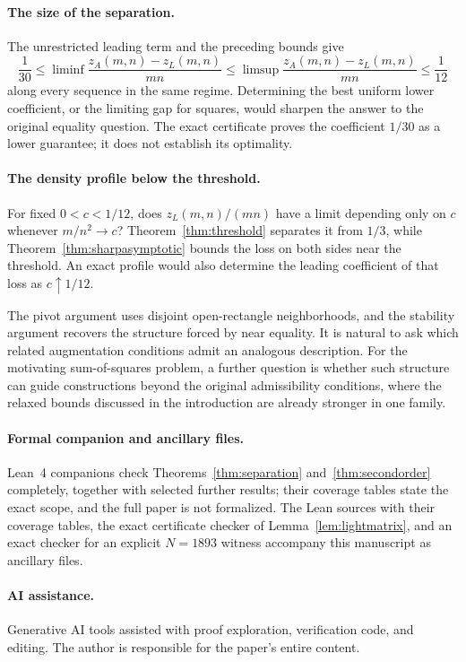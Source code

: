\documentclass[11pt]{article}
\newcommand{\za}{z_A}
\newcommand{\zl}{z_L}
\begin{document}
\paragraph{The size of the separation.}
The unrestricted leading term and the preceding bounds give
\[
 \frac1{30}\le
 \liminf\frac{\za(m,n)-\zl(m,n)}{mn}
 \le\limsup\frac{\za(m,n)-\zl(m,n)}{mn}
 \le\frac1{12}
\]
along every sequence in the same regime. Determining the best uniform
lower coefficient, or the limiting gap for squares, would sharpen the
answer to the original equality question. The exact certificate proves
the coefficient $1/30$ as a lower guarantee; it does not establish its
optimality.

\paragraph{The density profile below the threshold.}
For fixed $0<c<1/12$, does $\zl(m,n)/(mn)$ have a limit depending only
on $c$ whenever $m/n^2\to c$? Theorem~\ref{thm:threshold} separates it
from $1/3$, while Theorem~\ref{thm:sharpasymptotic} bounds the loss on
both sides near the threshold. An exact profile would also determine
the leading coefficient of that loss as $c\uparrow1/12$.

The pivot argument uses disjoint open-rectangle neighborhoods, and the
stability argument recovers the structure forced by near equality.
It is natural to ask which related augmentation conditions admit an
analogous description. For the motivating sum-of-squares problem, a
further question is whether such structure can guide constructions
beyond the original admissibility conditions, where the relaxed bounds
discussed in the introduction are already stronger in one family.


\paragraph{Formal companion and ancillary files.}
Lean~4 companions check Theorems~\ref{thm:separation}
and~\ref{thm:secondorder} completely, together with selected further
results; their coverage tables state the exact scope, and the full paper is
not formalized. The Lean sources with their coverage tables, the exact
certificate checker of Lemma~\ref{lem:lightmatrix}, and an exact checker
for an explicit $N=1893$ witness accompany this manuscript as ancillary
files.

\paragraph{AI assistance.}
Generative AI tools assisted with proof exploration, verification code,
and editing. The author is responsible for the paper's entire content.
\end{document}
